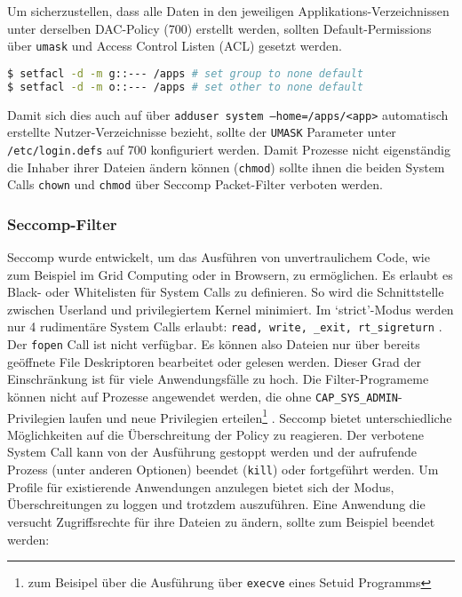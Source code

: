 Um sicherzustellen, dass alle Daten in den jeweiligen Applikations-Verzeichnissen unter derselben DAC-Policy (700) erstellt werden, sollten Default-Permissions über \texttt{umask} und Access Control Listen (ACL) gesetzt werden. 

\begin{lstlisting}[language=bash]
$ setfacl -d -m g::--- /apps # set group to none default
$ setfacl -d -m o::--- /apps # set other to none default
\end{lstlisting}

Damit sich dies auch auf über \texttt{adduser \-\-system --home=/apps/<app>} automatisch erstellte Nutzer-Verzeichnisse bezieht, sollte der \texttt{UMASK} Parameter unter \texttt{/etc/login.defs} auf 700 konfiguriert werden. Damit Prozesse nicht eigenständig die Inhaber ihrer Dateien ändern können (\texttt{chmod}) sollte ihnen die beiden System Calls \texttt{chown} und \texttt{chmod} über Seccomp Packet-Filter verboten werden. 

\subsubsection{Seccomp-Filter}

Seccomp wurde entwickelt, um das Ausführen von unvertraulichem Code, wie zum Beispiel im Grid Computing oder in Browsern, zu ermöglichen. Es erlaubt es Black- oder Whitelisten für System Calls zu definieren. So wird die Schnittstelle zwischen Userland und privilegiertem Kernel minimiert.
Im `strict'-Modus werden nur 4 rudimentäre System Calls erlaubt: \texttt{read, write, \_exit, rt\_sigreturn} \cite{man-seccomp}. Der \texttt{fopen} Call ist nicht verfügbar. Es können also Dateien nur über bereits geöffnete File Deskriptoren bearbeitet oder gelesen werden. Dieser Grad der Einschränkung ist für viele Anwendungsfälle zu hoch.
Die Filter-Programeme können nicht auf Prozesse angewendet werden, die ohne \texttt{CAP\_SYS\_ADMIN}-Privilegien laufen und neue Privilegien erteilen\footnote{zum Beisipel über die Ausführung über \texttt{execve} eines Setuid Programms} \cite{man-seccomp, man-prctl}.
Seccomp bietet unterschiedliche Möglichkeiten auf die Überschreitung der Policy zu reagieren. Der verbotene System Call kann von der Ausführung gestoppt werden und der aufrufende Prozess (unter anderen Optionen) beendet (\texttt{kill}) oder fortgeführt werden. Um Profile für existierende Anwendungen anzulegen bietet sich der Modus, Überschreitungen zu loggen und trotzdem auszuführen. Eine Anwendung die versucht Zugriffsrechte für ihre Dateien zu ändern, sollte zum Beispiel beendet
werden:

